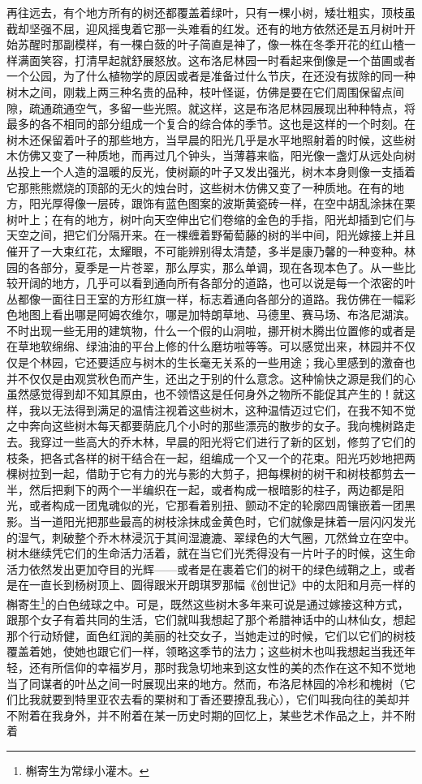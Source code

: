 \par 再往远去，有个地方所有的树还都覆盖着绿叶，只有一棵小树，矮壮粗实，顶枝虽截却坚强不屈，迎风摇曳着它那一头难看的红发。还有的地方依然还是五月树叶开始苏醒时那副模样，有一棵白蔹的叶子简直是神了，像一株在冬季开花的红山楂一样满面笑容，打清早起就舒展怒放。这布洛尼林园一时看起来倒像是一个苗圃或者一个公园，为了什么植物学的原因或者是准备过什么节庆，在还没有拔除的同一种树木之间，刚栽上两三种名贵的品种，枝叶怪诞，仿佛是要在它们周围保留点间隙，疏通疏通空气，多留一些光照。就这样，这是布洛尼林园展现出种种特点，将最多的各不相同的部分组成一个复合的综合体的季节。这也是这样的一个时刻。在树木还保留着叶子的那些地方，当早晨的阳光几乎是水平地照射着的时候，这些树木仿佛又变了一种质地，而再过几个钟头，当薄暮来临，阳光像一盏灯从远处向树丛投上一个人造的温暖的反光，使树巅的叶子又发出强光，树木本身则像一支插着它那熊熊燃烧的顶部的无火的烛台时，这些树木仿佛又变了一种质地。在有的地方，阳光厚得像一层砖，跟饰有蓝色图案的波斯黄瓷砖一样，在空中胡乱涂抹在栗树叶上；在有的地方，树叶向天空伸出它们卷缩的金色的手指，阳光却插到它们与天空之间，把它们分隔开来。在一棵缠着野葡萄藤的树的半中间，阳光嫁接上并且催开了一大束红花，太耀眼，不可能辨别得太清楚，多半是康乃馨的一种变种。林园的各部分，夏季是一片苍翠，那么厚实，那么单调，现在各现本色了。从一些比较开阔的地方，几乎可以看到通向所有各部分的道路，也可以说是每一个浓密的叶丛都像一面往日王室的方形红旗一样，标志着通向各部分的道路。我仿佛在一幅彩色地图上看出哪是阿姆农维尔，哪是加特朗草地、马德里、赛马场、布洛尼湖滨。不时出现一些无用的建筑物，什么一个假的山洞啦，挪开树木腾出位置修的或者是在草地软绵绵、绿油油的平台上修的什么磨坊啦等等。可以感觉出来，林园并不仅仅是个林园，它还要适应与树木的生长毫无关系的一些用途；我心里感到的激奋也并不仅仅是由观赏秋色而产生，还出之于别的什么意念。这种愉快之源是我们的心虽然感觉得到却不知其原由，也不领悟这是任何身外之物所不能促其产生的！就这样，我以无法得到满足的温情注视着这些树木，这种温情迈过它们，在我不知不觉之中奔向这些树木每天都要荫庇几个小时的那些漂亮的散步的女子。我向槐树路走去。我穿过一些高大的乔木林，早晨的阳光将它们进行了新的区划，修剪了它们的枝条，把各式各样的树干结合在一起，组编成一个又一个的花束。阳光巧妙地把两棵树拉到一起，借助于它有力的光与影的大剪子，把每棵树的树干和树枝都剪去一半，然后把剩下的两个一半编织在一起，或者构成一根暗影的柱子，两边都是阳光，或者构成一团鬼魂似的光，它那看着别扭、颤动不定的轮廓四周镶嵌着一团黑影。当一道阳光把那些最高的树枝涂抹成金黄色时，它们就像是抹着一层闪闪发光的湿气，刺破整个乔木林浸沉于其间湿漉漉、翠绿色的大气圈，兀然耸立在空中。树木继续凭它们的生命活力活着，就在当它们光秃得没有一片叶子的时候，这生命活力依然发出更加夺目的光辉——或者是在裹着它们的树干的绿色绒鞘之上，或者是在一直长到杨树顶上、圆得跟米开朗琪罗那幅《创世记》中的太阳和月亮一样的槲寄生\footnote{槲寄生为常绿小灌木。}的白色绒球之中。可是，既然这些树木多年来可说是通过嫁接这种方式，跟那个女子有着共同的生活，它们就叫我想起了那个希腊神话中的山林仙女，想起那个行动矫健，面色红润的美丽的社交女子，当她走过的时候，它们以它们的树枝覆盖着她，使她也跟它们一样，领略这季节的法力；这些树木也叫我想起当我还年轻，还有所信仰的幸福岁月，那时我急切地来到这女性的美的杰作在这不知不觉地当了同谋者的叶丛之间一时展现出来的地方。然而，布洛尼林园的冷杉和槐树（它们比我就要到特里亚农去看的栗树和丁香还要撩乱我心），它们叫我向往的美却并不附着在我身外，并不附着在某一历史时期的回忆上，某些艺术作品之上，并不附着